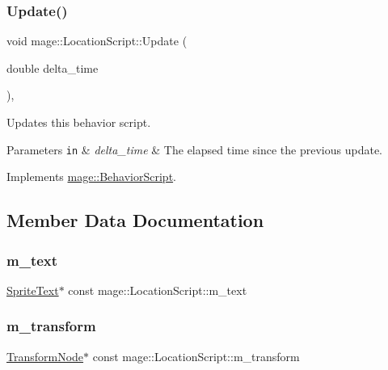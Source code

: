 \subsubsection{\texorpdfstring{Update()}{Update()}}
{\footnotesize\ttfamily void mage\+::\+Location\+Script\+::\+Update (\begin{DoxyParamCaption}\item[{double}]{delta\+\_\+time }\end{DoxyParamCaption})\hspace{0.3cm}{\ttfamily [override]}, {\ttfamily [virtual]}}

Updates this behavior script.


\begin{DoxyParams}[1]{Parameters}
\mbox{\tt in}  & {\em delta\+\_\+time} & The elapsed time since the previous update. \\
\hline
\end{DoxyParams}


Implements \hyperlink{classmage_1_1_behavior_script_a905b6c83640cb91d19fecab3435f6feb}{mage\+::\+Behavior\+Script}.



\subsection{Member Data Documentation}
\hypertarget{classmage_1_1_location_script_a90b8eae6654c666d0f628f906b9ef20d}{}\label{classmage_1_1_location_script_a90b8eae6654c666d0f628f906b9ef20d} 
\subsubsection{\texorpdfstring{m\+\_\+text}{m\_text}}
{\footnotesize\ttfamily \hyperlink{classmage_1_1_sprite_text}{Sprite\+Text}$\ast$ const mage\+::\+Location\+Script\+::m\+\_\+text\hspace{0.3cm}{\ttfamily [private]}}

\hypertarget{classmage_1_1_location_script_a6e4ed33a4d2031c8726731c64b8200c9}{}\label{classmage_1_1_location_script_a6e4ed33a4d2031c8726731c64b8200c9} 
\subsubsection{\texorpdfstring{m\+\_\+transform}{m\_transform}}
{\footnotesize\ttfamily \hyperlink{structmage_1_1_transform_node}{Transform\+Node}$\ast$ const mage\+::\+Location\+Script\+::m\+\_\+transform\hspace{0.3cm}{\ttfamily [private]}}

